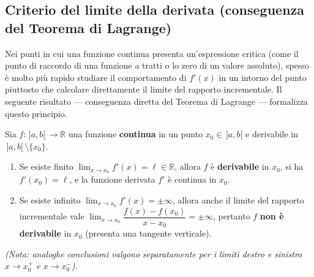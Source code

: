 \subsection{Criterio del limite della derivata (conseguenza del Teorema di Lagrange)}

Nei punti in cui una funzione continua presenta un'espressione critica (come il punto di raccordo di una funzione a tratti o lo zero di un valore assoluto), spesso è molto più rapido studiare il comportamento di $f'(x)$ in un intorno del punto piuttosto che calcolare direttamente il limite del rapporto incrementale. Il seguente risultato — conseguenza diretta del Teorema di Lagrange — formalizza questo principio.

\begin{propbox}
Sia $f \colon \,]a,b[\, \to \mathbb{R}$ una funzione \textbf{continua} in un punto $x_0 \in \,]a,b[$ e derivabile in $\,]a,b[\, \setminus \{x_0\}$.
\begin{enumerate}
    \item Se esiste finito $\lim_{x \to x_0} f'(x) = \ell \in \mathbb{R}$, allora $f$ è \textbf{derivabile} in $x_0$, si ha $f'(x_0) = \ell$, e la funzione derivata $f'$ è continua in $x_0$.
    \item Se esiste infinito $\lim_{x \to x_0} f'(x) = \pm\infty$, allora anche il limite del rapporto incrementale vale $\lim_{x \to x_0} \dfrac{f(x) - f(x_0)}{x - x_0} = \pm\infty$, pertanto $f$ \textbf{non è derivabile} in $x_0$ (presenta una tangente verticale).
\end{enumerate}
\emph{(Nota: analoghe conclusioni valgono separatamente per i limiti destro e sinistro $x \to x_0^+$ e $x \to x_0^-$).}
\end{propbox}

